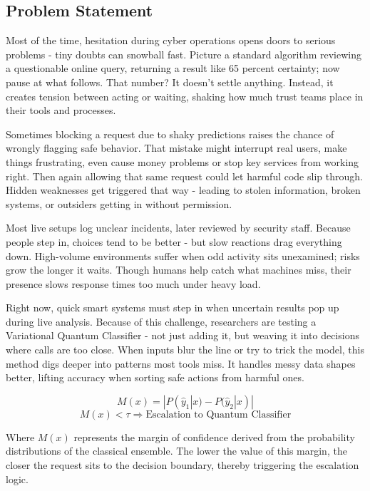 \documentclass[journal,onecolumn]{IEEEtran}
\begin{document}
\subsection{Problem Statement}
Most of the time, hesitation during cyber operations opens doors to serious problems - tiny doubts can snowball fast. Picture a standard algorithm reviewing a questionable online query, returning a result like 65 percent certainty; now pause at what follows. That number? It doesn't settle anything. Instead, it creates tension between acting or waiting, shaking how much trust teams place in their tools and processes.

Sometimes blocking a request due to shaky predictions raises the chance of wrongly flagging safe behavior. That mistake might interrupt real users, make things frustrating, even cause money problems or stop key services from working right. Then again allowing that same request could let harmful code slip through. Hidden weaknesses get triggered that way - leading to stolen information, broken systems, or outsiders getting in without permission.

Most live setups log unclear incidents, later reviewed by security staff. Because people step in, choices tend to be better - but slow reactions drag everything down. High-volume environments suffer when odd activity sits unexamined; risks grow the longer it waits. Though humans help catch what machines miss, their presence slows response times too much under heavy load.

Right now, quick smart systems must step in when uncertain results pop up during live analysis. Because of this challenge, researchers are testing a Variational Quantum Classifier - not just adding it, but weaving it into decisions where calls are too close. When inputs blur the line or try to trick the model, this method digs deeper into patterns most tools miss. It handles messy data shapes better, lifting accuracy when sorting safe actions from harmful ones.

\begin{equation}M(x) = | P(\hat{y}_1|x) - P(\hat{y}_2|x) |\end{equation}
\begin{equation}M(x) < \tau \Rightarrow \text{Escalation to Quantum Classifier}\end{equation}

Where $M(x)$ represents the margin of confidence derived from the probability distributions of the classical ensemble. The lower the value of this margin, the closer the request sits to the decision boundary, thereby triggering the escalation logic.
\end{document}
